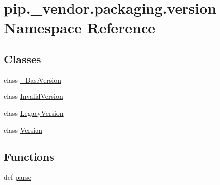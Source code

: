 \hypertarget{namespacepip_1_1__vendor_1_1packaging_1_1version}{}\section{pip.\+\_\+vendor.\+packaging.\+version Namespace Reference}
\label{namespacepip_1_1__vendor_1_1packaging_1_1version}
\subsection*{Classes}
\begin{DoxyCompactItemize}
\item 
class \hyperlink{classpip_1_1__vendor_1_1packaging_1_1version_1_1__BaseVersion}{\+\_\+\+Base\+Version}
\item 
class \hyperlink{classpip_1_1__vendor_1_1packaging_1_1version_1_1InvalidVersion}{Invalid\+Version}
\item 
class \hyperlink{classpip_1_1__vendor_1_1packaging_1_1version_1_1LegacyVersion}{Legacy\+Version}
\item 
class \hyperlink{classpip_1_1__vendor_1_1packaging_1_1version_1_1Version}{Version}
\end{DoxyCompactItemize}
\subsection*{Functions}
\begin{DoxyCompactItemize}
\item 
def \hyperlink{namespacepip_1_1__vendor_1_1packaging_1_1version_a2e8fa91e611195b709fdd36e1fb002b8}{parse}
\end{DoxyCompactItemize}

